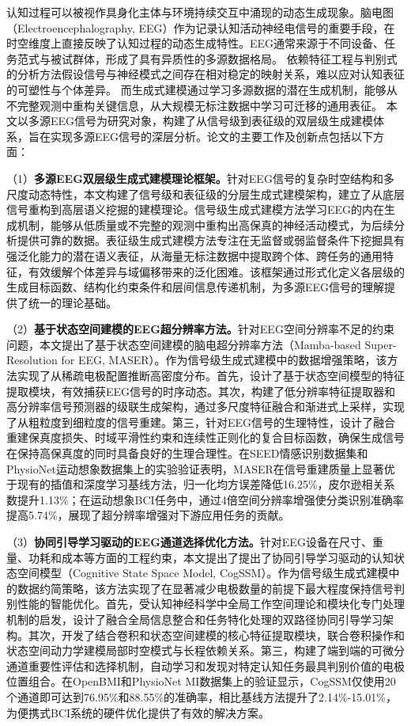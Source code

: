 \begin{cabstract}
认知过程可以被视作具身化主体与环境持续交互中涌现的动态生成现象。脑电图（Electroencephalography, EEG）作为记录认知活动神经电信号的重要手段，在时空维度上直接反映了认知过程的动态生成特性。EEG通常来源于不同设备、任务范式与被试群体，形成了具有异质性的多源数据格局。
依赖特征工程与判别式的分析方法假设信号与神经模式之间存在相对稳定的映射关系，难以应对认知表征的可塑性与个体差异。
而生成式建模通过学习多源数据的潜在生成机制，能够从不完整观测中重构关键信息，从大规模无标注数据中学习可迁移的通用表征。
本文以多源EEG信号为研究对象，构建了从信号级到表征级的双层级生成建模体系，旨在实现多源EEG信号的深层分析。论文的主要工作及创新点包括以下方面：

（1）\textbf{多源EEG双层级生成式建模理论框架。}针对EEG信号的复杂时空结构和多尺度动态特性，本文构建了信号级和表征级的分层生成式建模架构，建立了从底层信号重构到高层语义挖掘的建模理论。信号级生成式建模方法学习EEG的内在生成机制，能够从低质量或不完整的观测中重构出高保真的神经活动模式，为后续分析提供可靠的数据。表征级生成式建模方法专注在无监督或弱监督条件下挖掘具有强泛化能力的潜在语义表征，从海量无标注数据中提取跨个体、跨任务的通用特征，有效缓解个体差异与域偏移带来的泛化困难。该框架通过形式化定义各层级的生成目标函数、结构化约束条件和层间信息传递机制，为多源EEG信号的理解提供了统一的理论基础。

（2）\textbf{基于状态空间建模的EEG超分辨率方法。}针对EEG空间分辨率不足的约束问题，本文提出了基于状态空间建模的脑电超分辨率方法（Mamba-based Super-Resolution for EEG, MASER）。作为信号级生成式建模中的数据增强策略，该方法实现了从稀疏电极配置推断高密度分布。首先，设计了基于状态空间模型的特征提取模块，有效捕获EEG信号的时序动态。其次，构建了低分辨率特征提取器和高分辨率信号预测器的级联生成架构，通过多尺度特征融合和渐进式上采样，实现了从粗粒度到细粒度的信号重建。第三，针对EEG信号的生理特性，设计了融合重建保真度损失、时域平滑性约束和连续性正则化的复合目标函数，确保生成信号在保持高保真度的同时具备良好的生理合理性。在SEED情感识别数据集和PhysioNet运动想象数据集上的实验验证表明，MASER在信号重建质量上显著优于现有的插值和深度学习基线方法，归一化均方误差降低16.25\%，皮尔逊相关系数提升1.13\%；在运动想象BCI任务中，通过4倍空间分辨率增强使分类识别准确率提高5.74\%，展现了超分辨率增强对下游应用任务的贡献。

（3）\textbf{协同引导学习驱动的EEG通道选择优化方法。}针对EEG设备在尺寸、重量、功耗和成本等方面的工程约束，本文提出了提出了协同引导学习驱动的认知状态空间模型（Cognitive State Space Model, CogSSM）。作为信号级生成式建模中的数据约简策略，该方法实现了在显著减少电极数量的前提下最大程度保持信号判别性能的智能优化。首先，受认知神经科学中全局工作空间理论和模块化专门处理机制的启发，设计了融合全局信息整合和任务特化处理的双路径协同引导学习架构。其次，开发了结合卷积和状态空间建模的核心特征提取模块，联合卷积操作和状态空间动力学建模局部时空模式与长程依赖关系。第三，构建了端到端的可微分通道重要性评估和选择机制，自动学习和发现对特定认知任务最具判别价值的电极位置组合。在OpenBMI和PhysioNet MI数据集上的验证显示，CogSSM仅使用20个通道即可达到76.95\%和88.55\%的准确率，相比基线方法提升了2.14\%-15.01\%，为便携式BCI系统的硬件优化提供了有效的解决方案。


\end{cabstract}
